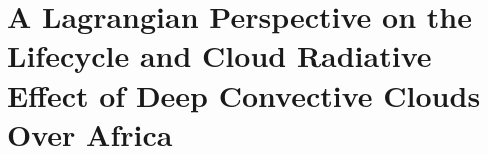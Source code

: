 \chapter{A Lagrangian Perspective on the Lifecycle and Cloud Radiative Effect of Deep Convective Clouds Over Africa}





